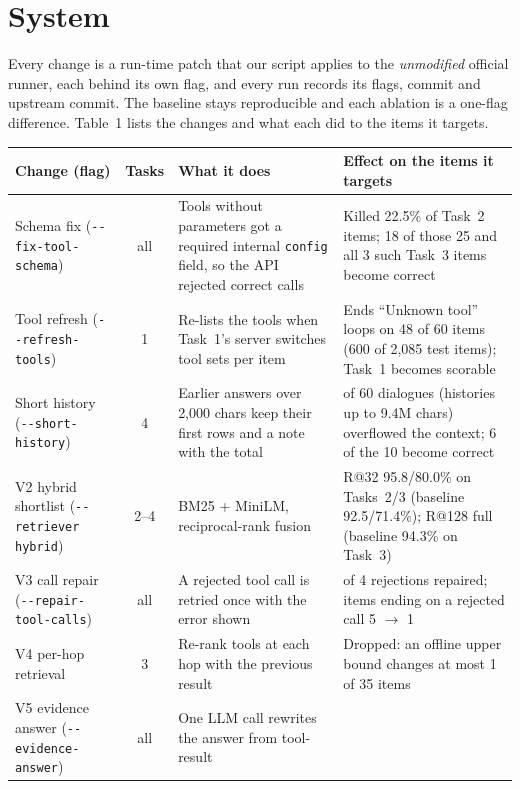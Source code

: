 \documentclass[10pt]{article}
\newcommand{\fl}[1]{\texttt{-{}-#1}}
\begin{document}
\section{System}
Every change is a run-time patch that our script applies to the \emph{unmodified} official runner,
each behind its own flag, and every run records its flags, commit and upstream commit. The baseline
stays reproducible and each ablation is a one-flag difference. Table~1 lists the changes and what
each did to the items it targets.

\begin{center}\small
\begin{tabular}{@{}>{\raggedright\arraybackslash}p{}@{\hspace{4pt}}c@{\hspace{5pt}}>{\raggedright\arraybackslash}p{}@{\hspace{6pt}}>{\raggedright\arraybackslash}p{}@{}}
\toprule
Change (flag) & Tasks & What it does & Effect on the items it targets \\
\midrule
Schema fix (\fl{fix-tool-schema}) & all & Tools without parameters got a required internal \texttt{config}
  field, so the API rejected correct calls & Killed 22.5\% of Task~2 items; 18 of those 25 and all 3 such Task~3
  items become correct \\
Tool refresh (\fl{refresh-tools}) & 1 & Re-lists the tools when Task~1's server switches tool sets per item
  & Ends ``Unknown tool'' loops on 48 of 60 items (600 of 2,085 test items); Task~1
  becomes scorable \\
Short history (\fl{short-history}) & 4 & Earlier answers over 2,000 chars keep their first rows and a
  note with the total & 10 of 60 dialogues (histories up to 9.4M chars) overflowed the context; 6 of the 10
  become correct \\
V2 hybrid shortlist (\fl{retriever hybrid}) & 2--4 & BM25 + MiniLM, reciprocal-rank fusion & R@32 95.8/80.0\% on Tasks~2/3
  (baseline 92.5/71.4\%); R@128 full (baseline 94.3\% on Task~3) \\
V3 call repair (\fl{repair-tool-calls}) & all & A rejected tool call is retried once with the error shown
  & 3 of 4 rejections repaired; items ending on a rejected call 5 $\rightarrow$ 1 \\
V4 per-hop retrieval & 3 & Re-rank tools at each hop with the previous result & Dropped: an offline upper
  bound changes at most 1 of 35 items \\
V5 evidence answer (\fl{evidence-answer}) & all & One LLM call rewrites the answer from tool-result

\end{tabular}
\end{center}
\end{document}
